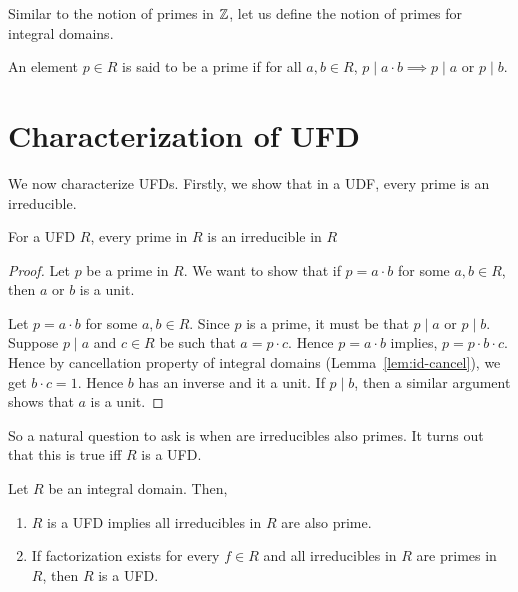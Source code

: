 Similar to the notion of primes in ${\mathbb{Z}}$, let us define the notion of primes
for integral domains.
\begin{definition}[Prime]
	An element $p \in R$ is said to be a prime if for all $a,b \in R$,
	$p \mid a\cdot b \implies p \mid a$ or $p \mid b$.
\end{definition}

\section{Characterization of UFD}
We now characterize UFDs. Firstly, we show that in a UDF, every prime is 
an irreducible.
\begin{lemma}
	For a UFD $R$, every prime in $R$ is an irreducible in $R$
\end{lemma}
\begin{proof}
	Let $p$ be a prime in $R$. We want to show that if $p=a\cdot b$ for
	some $a,b \in R$, then $a$ or $b$ is a unit.

	Let $p =a\cdot b$ for some $a, b \in R$. Since $p$ is a prime, it must
	be that $p \mid a$ or $p \mid b$. Suppose $p \mid a$ and $c \in R$ be
	such that $a = p\cdot  c$. Hence $p =a \cdot b$ implies, $p = p \cdot
	b \cdot c$. Hence by cancellation property of integral domains
	(Lemma~\ref{lem:id-cancel}), we get $b\cdot c = 1$. Hence $b$ has an
	inverse and it a unit. If $p \mid b$, then a similar argument shows
	that $a$ is a unit.
\end{proof}
So a natural question to ask is when are irreducibles also primes. It turns
out that this is true iff $R$ is a UFD. 
\begin{theorem}
	Let $R$ be an integral domain. Then,
	\begin{enumerate}
		\item $R$ is a UFD implies all irreducibles in $R$ are also
			prime.  
		\item If factorization exists for every $f \in R$ and all
			irreducibles in $R$ are primes in $R$, then $R$ is a
			UFD.
	\end{enumerate}
	\label{thm:ufd-characterisation}
\end{theorem}
